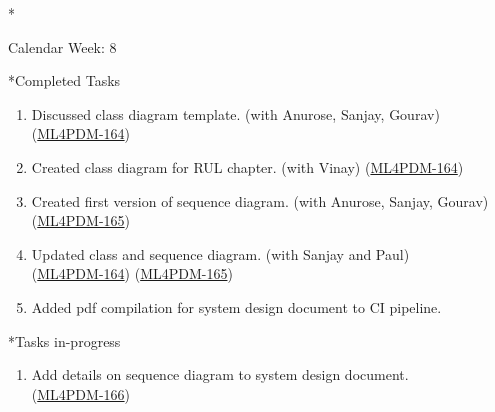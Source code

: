 \documentclass[11pt,a4paper]{article}
\begin{document}
\newpage
\begin{section}*{Calendar Week: 8 \hfill \date{26 February, 2021}}
 \begin{refsection}
   \begin{subsection}*{Completed Tasks}
     \begin{enumerate}
       \item
             Discussed class diagram template. (with Anurose, Sanjay, Gourav) (\href{https://ml4pdm.atlassian.net/browse/ML4PDM-164}{ML4PDM-164})
       \item
             Created class diagram for RUL chapter. (with Vinay) (\href{https://ml4pdm.atlassian.net/browse/ML4PDM-164}{ML4PDM-164})
       \item
             Created first version of sequence diagram. (with Anurose, Sanjay, Gourav) (\href{https://ml4pdm.atlassian.net/browse/ML4PDM-165}{ML4PDM-165})
       \item
             Updated class and sequence diagram. (with Sanjay and Paul)\\
             (\href{https://ml4pdm.atlassian.net/browse/ML4PDM-164}{ML4PDM-164}) (\href{https://ml4pdm.atlassian.net/browse/ML4PDM-165}{ML4PDM-165})
       \item
             Added pdf compilation for system design document to CI pipeline.
     \end{enumerate}
   \end{subsection}
   \begin{subsection}*{Tasks in-progress}
     \begin{enumerate}
       \item
             Add details on sequence diagram to system design document.\\
             (\href{https://ml4pdm.atlassian.net/browse/ML4PDM-166}{ML4PDM-166})
     \end{enumerate}
   \end{subsection}
 \end{refsection}
\end{section}
\end{document}
